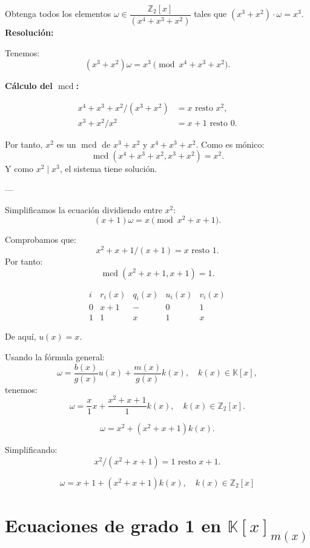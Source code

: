 \documentclass[a4paper,12pt]{article}
\begin{document}
\begin{ejercicio}[title=Ejercicio 58]
Obtenga todos los elementos $\omega \in \dfrac{\mathbb{Z}_2[x]}{(x^4 + x^3 + x^2)}$ tales que $(x^3 + x^2)\cdot\omega = x^3$.
\tcblower
\textbf{Resolución:}

Tenemos:
\[
(x^3 + x^2)\omega = x^3 \pmod{x^4 + x^3 + x^2}.
\]

\textbf{Cálculo del $\operatorname{mcd}$:}

\[
\begin{aligned}
x^4 + x^3 + x^2 / (x^3 + x^2) &= x \text{ resto } \boxed{x^2}, \\
x^3 + x^2 / x^2 &= x + 1 \text{ resto } 0.
\end{aligned}
\]

Por tanto, $x^2$ es un $\operatorname{mcd}$ de $x^3 + x^2$ y $x^4 + x^3 + x^2$.  
Como es mónico:
\[
\operatorname{mcd}(x^4 + x^3 + x^2, x^3 + x^2) = x^2.
\]
Y como $x^2 \mid x^3$, el sistema tiene solución.

---

Simplificamos la ecuación dividiendo entre $x^2$:
\[
(x + 1)\omega = x \pmod{x^2 + x + 1}.
\]

Comprobamos que:
\[
x^2 + x + 1 / (x + 1) = x \text{ resto } \boxed{1}.
\]
Por tanto:
\[
\operatorname{mcd}(x^2 + x + 1, x + 1) = \boxed{1}.
\]

\[
\begin{array}{c|c|c|c|c}
i & r_i(x) & q_i(x) & u_i(x) & v_i(x) \\ \hline
0 & x + 1 & - & 0 & 1 \\
1 & \boxed{1} & x & 1 & x
\end{array}
\]

De aquí, $u(x) = x$.

Usando la fórmula general:
\[
\omega = \frac{b(x)}{g(x)}u(x) + \frac{m(x)}{g(x)}k(x), \quad k(x) \in \mathbb{K}[x],
\]
tenemos:
\[
\omega = \frac{x}{1}x + \frac{x^2 + x + 1}{1}k(x), \quad k(x) \in \mathbb{Z}_2[x].
\]

\[
\omega = x^2 + (x^2 + x + 1)k(x).
\]

Simplificando:
\[
x^2 / (x^2 + x + 1) = 1 \text{ resto } x + 1.
\]

\[
\boxed{\omega = x + 1 + (x^2 + x + 1)k(x), \quad k(x) \in \mathbb{Z}_2[x]}
\]
\end{ejercicio}

\section{Ecuaciones de grado 1 en \(\mathbb{K}[x]_{m(x)}\)}
\end{document}
